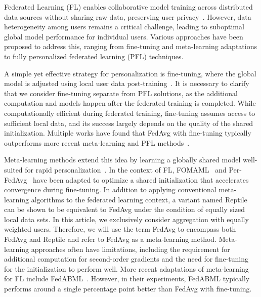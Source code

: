 Federated Learning (FL) enables collaborative model training across distributed data sources without sharing raw data, preserving user privacy~\citep{fed-learn, fed-learn-adv, fed-learn-survey}.
However, data heterogeneity among users remains a critical challenge, leading to suboptimal global model performance for individual users.
Various approaches have been proposed to address this, ranging from fine-tuning and meta-learning adaptations to fully personalized federated learning (PFL) techniques.

A simple yet effective strategy for personalization is fine-tuning, where the global model is adjusted using local user data post-training~\citep{ft-is-fine, pfl-bench, pfl}.
It is necessary to clarify that we consider fine-tuning separate from PFL solutions, as the additional computation and models happen after the federated training is completed.
While computationally efficient during federated training, fine-tuning assumes access to sufficient local data, and its success largely depends on the quality of the shared initialization.
Multiple works have found that FedAvg with fine-tuning typically outperforms more recent meta-learning and PFL methods~\citep{ft-is-fine, benchmark-for-pfl, bridging-pfl}.

Meta-learning methods extend this idea by learning a globally shared model well-suited for rapid personalization~\citep{maml, meta-learning1, meta-learning2, debias-ml}.
In the context of FL, FOMAML~\citep{maml} and Per-FedAvg~\citep{per-fedavg} have been adapted to optimize a shared initialization that accelerates convergence during fine-tuning.
In addition to applying conventional meta-learning algorithms to the federated learning context, a variant named Reptile \citep{reptile} can be shown to be equivalent to FedAvg under the condition of equally sized local data sets.
In this article, we exclusively consider aggregation with equally weighted users.
Therefore, we will use the term FedAvg to encompass both FedAvg and Reptile and refer to FedAvg as a meta-learning method.
Meta-learning approaches often have limitations, including the requirement for additional computation for second-order gradients and the need for fine-tuning for the initialization to perform well.
More recent adaptations of meta-learning for FL include FedABML~\citep{fedabml}.
However, in their experiments, FedABML typically performs around a single percentage point better than FedAvg with fine-tuning.

